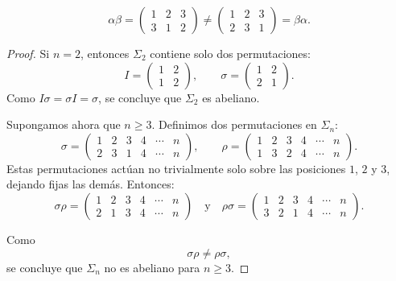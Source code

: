 \begin{observacion}
{		\[
		\alpha \beta =
		\left(
		\begin{array}{ccc}
			1 & 2 & 3 \\ 
			3 & 1 & 2
		\end{array}
		\right)
		\neq 
		\left(
		\begin{array}{ccc}
			1 & 2 & 3 \\ 
			2 & 3 & 1
		\end{array}
		\right)
		= \beta \alpha.
		\]
		
	}
\end{observacion}

\medskip
\begin{proposicion}
\end{proposicion}

\begin{proof}
	Si \(n = 2\), entonces \(\Sigma_2\) contiene solo dos permutaciones:
	\[
	I = \left(\begin{array}{cc}
		1 & 2 \\
		1 & 2
	\end{array}\right),
	\qquad
	\sigma = \left(\begin{array}{cc}
		1 & 2 \\
		2 & 1
	\end{array}\right).
	\]
	Como \(I \sigma = \sigma I = \sigma\), se concluye que \(\Sigma_2\) es abeliano.
	
	\medskip
	\noindent Supongamos ahora que \(n \geq 3\). Definimos dos permutaciones en \(\Sigma_n\):
	\[
	\sigma = \left(\begin{array}{ccccccc}
		1 & 2 & 3 & 4 & \cdots & n \\
		2 & 3 & 1 & 4 & \cdots & n
	\end{array}\right),
	\qquad
	\rho = \left(\begin{array}{ccccccc}
		1 & 2 & 3 & 4 & \cdots & n \\
		1 & 3 & 2 & 4 & \cdots & n
	\end{array}\right).
	\]
	Estas permutaciones actúan no trivialmente solo sobre las posiciones \(1\), \(2\) y \(3\), dejando fijas las demás.
	Entonces:
	\[
	\sigma\rho = \left(\begin{array}{ccccccc}
		1 & 2 & 3 & 4 & \cdots & n \\
		2 & 1 & 3 & 4 & \cdots & n
	\end{array}\right)\quad\text{y}\quad
	\rho\sigma = \left(\begin{array}{ccccccc}
		1 & 2 & 3 & 4 & \cdots & n \\
		3 & 2 & 1 & 4 & \cdots & n
	\end{array}\right).
	\]
	
	\medskip
	\noindent Como
	\[
	\sigma\rho \neq \rho\sigma,
	\]
	se concluye que \(\Sigma_n\) no es abeliano para \(n \geq 3\).
\end{proof}

